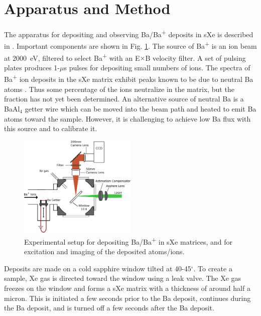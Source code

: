 \documentclass[aps,pra,reprint,superscriptaddress]{revtex4-1}
\begin{document}

\section{Apparatus and Method}
\label{sec:apparatus}

The apparatus for depositing and observing Ba/Ba\textsuperscript{+} deposits in sXe is described in \cite{Mong2015}.  Important components are shown in Fig. \ref{fig:apparatus}.  The source of Ba\textsuperscript{+} is an ion beam at 2000~eV, filtered to select Ba\textsuperscript{+} with an E$\times$B velocity filter.  A set of pulsing plates produces 1-$\mu$s pulses for depositing small numbers of ions.  The spectra of Ba\textsuperscript{+} ion deposits in the sXe matrix exhibit peaks known to be due to neutral Ba atoms \cite{Mong2015}.  Thus some percentage of the ions neutralize in the matrix, but the fraction has not yet been determined.  An alternative source of neutral Ba is a BaAl$_{4}$ getter wire which can be moved into the beam path and heated to emit Ba atoms toward the sample.  However, it is challenging to achieve low Ba flux with this source and to calibrate it.

\begin{figure}
\includegraphics[width=0.5\textwidth]{figures/cryo_inkscape_chris_full.eps}
\caption{Experimental setup for depositing Ba/Ba\textsuperscript{+} in sXe matrices, and for excitation and imaging of the deposited atoms/ions.}
\label{fig:apparatus}
\end{figure}

Deposits are made on a cold sapphire window tilted at 40-45$^{\circ}$.  To create a sample, Xe gas is directed toward the window using a leak valve. The Xe gas freezes on the window and forms a sXe matrix with a thickness of around half a micron.  This is initiated a few seconds prior to the Ba deposit, continues during the Ba deposit, and is turned off a few seconds after the Ba deposit.
\end{document}
